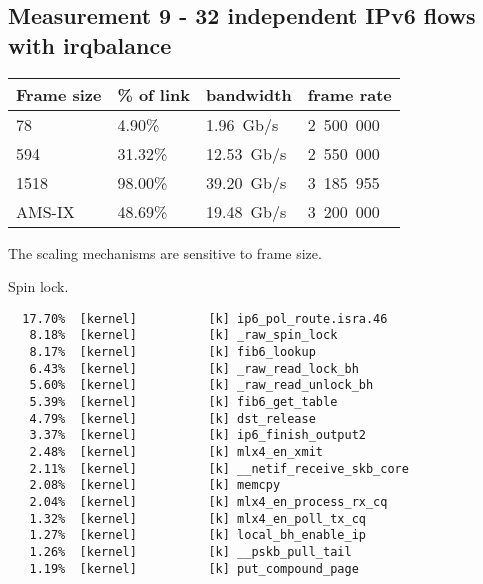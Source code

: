 
\subsection{Measurement 9 - 32 independent IPv6 flows with irqbalance}

\begin{tabular}{ | l | l | l | l | }
\hline
Frame size & \% of link & bandwidth & frame rate \\
\hline
78     &  4.90\% &  1.96~Gb/s & 2~500~000 \\
594    & 31.32\% & 12.53~Gb/s & 2~550~000 \\
1518   & 98.00\% & 39.20~Gb/s & 3~185~955 \\
AMS-IX & 48.69\% & 19.48~Gb/s & 3~200~000 \\
\hline
\end{tabular}

The scaling mechanisms are sensitive to frame size.

Spin lock.

\begin{lstlisting}
  17.70%  [kernel]          [k] ip6_pol_route.isra.46
   8.18%  [kernel]          [k] _raw_spin_lock
   8.17%  [kernel]          [k] fib6_lookup
   6.43%  [kernel]          [k] _raw_read_lock_bh
   5.60%  [kernel]          [k] _raw_read_unlock_bh
   5.39%  [kernel]          [k] fib6_get_table
   4.79%  [kernel]          [k] dst_release
   3.37%  [kernel]          [k] ip6_finish_output2
   2.48%  [kernel]          [k] mlx4_en_xmit
   2.11%  [kernel]          [k] __netif_receive_skb_core
   2.08%  [kernel]          [k] memcpy
   2.04%  [kernel]          [k] mlx4_en_process_rx_cq
   1.32%  [kernel]          [k] mlx4_en_poll_tx_cq
   1.27%  [kernel]          [k] local_bh_enable_ip
   1.26%  [kernel]          [k] __pskb_pull_tail
   1.19%  [kernel]          [k] put_compound_page
\end{lstlisting}
